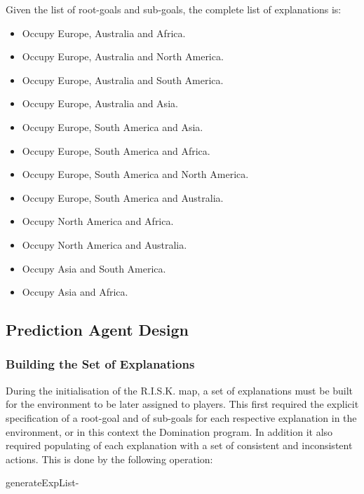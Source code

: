 \documentclass[parskip]{cs4rep}
\begin{document}
Given the list of root-goals and sub-goals, the complete list of explanations is:

\begin{itemize}
\item
Occupy Europe, Australia and Africa.
\item
Occupy Europe, Australia and North America.
\item
Occupy Europe, Australia and South America.
\item
Occupy Europe, Australia and Asia.
\item
Occupy Europe, South America and Asia.
\item
Occupy Europe, South America and Africa.
\item
Occupy Europe, South America and North America.
\item
Occupy Europe, South America and Australia.
\item
Occupy North America and Africa.
\item
Occupy North America and Australia.
\item
Occupy Asia and South America.
\item
Occupy Asia and Africa.
\end{itemize}

\subsection{Prediction Agent Design}

\subsubsection{Building the Set of Explanations}

During the initialisation of the R.I.S.K. map, a set of explanations must be built for the environment to be later assigned to players. This first required the explicit specification of a root-goal and of sub-goals for each respective explanation in the environment, or in this context the Domination program. In addition it also required populating of each explanation with a set of consistent and inconsistent actions. This is done by the following operation:

\begin{pseudocode}[ruled]{generateExpList}{-}
\begin{algorithm}[H]
\end{algorithm}
\end{pseudocode}
\end{document}

